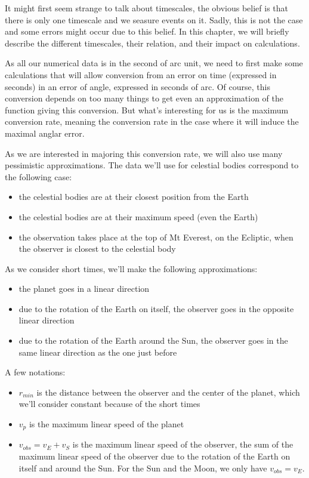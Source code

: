 

It might first seem strange to talk about timescales, the obvious belief is that there is only one timescale and we seasure events on it. Sadly, this is not the case and some errors might occur due to this belief. In this chapter, we will briefly describe the different timescales, their relation, and their impact on calculations.


As all our numerical data is in the second of arc unit, we need to first make some calculations that will allow conversion from an error on time (expressed in seconds) in an error of angle, expressed in seconds of arc. Of course, this conversion depends on too many things to get even an approximation of the function giving this conversion. But what's interesting for us is the maximum conversion rate, meaning the conversion rate in the case where it will induce the maximal anglar error. 

As we are interested in majoring this conversion rate, we will also use many pessimistic approximations. The data we'll use for celestial bodies correspond to the following case:

\begin{itemize}
\item the celestial bodies are at their closest position from the Earth
\item the celestial bodies are at their maximum speed (even the Earth)
\item the observation takes place at the top of Mt Everest, on the Ecliptic, when the observer is closest to the celestial body
\end{itemize}

As we consider short times, we'll make the following approximations:
\begin{itemize}
\item the planet goes in a linear direction
\item due to the rotation of the Earth on itself, the observer goes in the opposite linear direction
\item due to the rotation of the Earth around the Sun, the observer goes in the same linear direction as the one just before
\end{itemize}

A few notations:
\begin{itemize}
\item $r_{min}$ is the distance between the observer and the center of the planet, which we'll consider constant because of the short times
\item $v_{p}$ is the maximum linear speed of the planet
\item $v_{obs}=v_{E}+v_{S}$ is the maximum linear speed of the observer, the sum of the maximum linear speed of the observer due to the rotation of the Earth on itself and around the Sun. For the Sun and the Moon, we only have $v_{obs}=v_{E}$.
\end{itemize}

